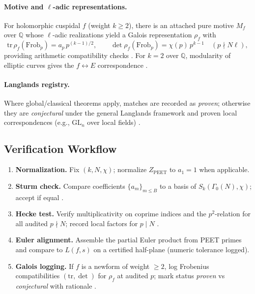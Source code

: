 \documentclass[12pt]{amsart}
\theoremstyle{plain}
\begin{document}
\paragraph{Motive and $\ell$-adic representations.}
For holomorphic cuspidal $f$ (weight $k\ge2$), there is an attached pure motive $M_f$ over $\mathbb{Q}$ whose $\ell$-adic realizations yield a Galois representation $\rho_f$ with
\[
\mathrm{tr}\,\rho_f(\mathrm{Frob}_p)=a_p\,p^{(k-1)/2},\qquad
\det\rho_f(\mathrm{Frob}_p)=\chi(p)\,p^{k-1}\quad(p\nmid N\ell),
\]
providing arithmetic compatibility checks \cite{deligne1971formes,scholl1990motives}. For $k=2$ over $\mathbb{Q}$, modularity of elliptic curves gives the $f\leftrightarrow E$ correspondence \cite{wiles1995modular,taylor1995ring}.

\paragraph{Langlands registry.}
Where global/classical theorems apply, matches are recorded as \emph{proven}; otherwise they are \emph{conjectural} under the general Langlands framework and proven local correspondences (e.g., $\mathrm{GL}_n$ over local fields) \cite{langlands1970problems,harris2001geometry}.

\subsection{Verification Workflow}
\begin{enumerate}
  \item \textbf{Normalization.} Fix $(k,N,\chi)$; normalize $Z_{\mathrm{PEET}}$ to $a_1=1$ when applicable.
  \item \textbf{Sturm check.} Compare coefficients $\{a_m\}_{m\le B}$ to a basis of $S_k(\Gamma_0(N),\chi)$; accept if equal \cite{sturm1987congruence,diamond2005first}.
  \item \textbf{Hecke test.} Verify multiplicativity on coprime indices and the $p^2$-relation for all audited $p\nmid N$; record local factors for $p\mid N$ \cite{diamond2005first}.
  \item \textbf{Euler alignment.} Assemble the partial Euler product from PEET primes and compare to $L(f,s)$ on a certified half-plane (numeric tolerance logged).
  \item \textbf{Galois logging.} If $f$ is a newform of weight $\ge2$, log Frobenius compatibilities $(\mathrm{tr},\det)$ for $\rho_f$ at audited $p$; mark status \emph{proven} vs \emph{conjectural} with rationale \cite{deligne1971formes,harris2001geometry}.
\end{enumerate}
\end{document}
